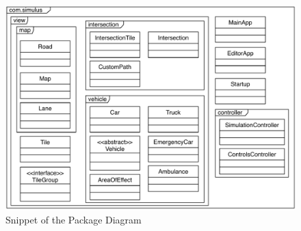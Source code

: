 \begin{figure}[t]
	\begin{center}
		\includegraphics[width=\textwidth]{img/package_diagram.pdf}
		\caption[Snippet of the Package Diagram]{Snippet of the Package Diagram}
		\label{fig:packages}
	\end{center}
\end{figure}

